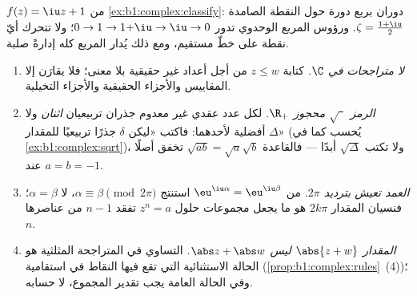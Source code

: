 \begin{omfigure}

{\small {} $f(z) = \iu z + 1$ من
\cref{ex:b1:complex:classify}: دوران بربع دورة حول
النقطة الصامدة $\zeta = \frac{1+\iu}2$. ورؤوس المربع
الوحدوي تدور $0 \to 1 \to 1{+}\iu \to \iu \to 0$؛ ولا تتحرك أيّ نقطة
على خطّ مستقيم، ومع ذلك يُدار المربع كله إدارةً صلبة.}
\end{omfigure}

\begin{remark}\label{rem:b1:complex:pitfalls}
\begin{enumerate}
  \item \emph{لا متراجحات في $\C$.} كتابة $z \leq w$ من أجل
        أعداد غير حقيقية بلا معنى؛ فلا يقارَن إلا المقاييس
        والأجزاء الحقيقية والأجزاء التخيلية.
  \item \emph{الرمز $\sqrt{\phantom z}$ محجوز  $\R_+$.} لكل
        عدد عقدي غير معدوم جذران تربيعيان \emph{اثنان} ولا
        أفضلية لأحدهما: فاكتب «ليكن $\delta$ جذرًا تربيعيًا
        للمقدار $\Delta$» (يُحسب كما في
        \cref{ex:b1:complex:sqrt})، ولا تكتب $\sqrt\Delta$ أبدًا ---
        فالقاعدة $\sqrt{ab} = \sqrt a\sqrt b$ تخفق أصلًا عند
        $a = b = -1$.
  \item \emph{العمد تعيش بترديد $2\pi$.} من
        $\eu^{\iu\alpha} = \eu^{\iu\beta}$ استنتج $\alpha
        \equiv \beta \pmod{2\pi}$، لا $\alpha = \beta$؛
        فنسيان المقدار $2k\pi$ هو ما يجعل مجموعات حلول $z^n = a$
        تفقد $n - 1$ من عناصرها $n$.
  \item \emph{المقدار $\abs{z + w}$ ليس $\abs z + \abs w$.} التساوي
        في المتراجحة المثلثية هو الحالة الاستثنائية التي تقع فيها
        النقاط في استقامية (\cref{prop:b1:complex:rules}~(4))؛ وفي الحالة العامة
        يجب تقدير  المجموع، لا حسابه.
\end{enumerate}
\end{remark}

